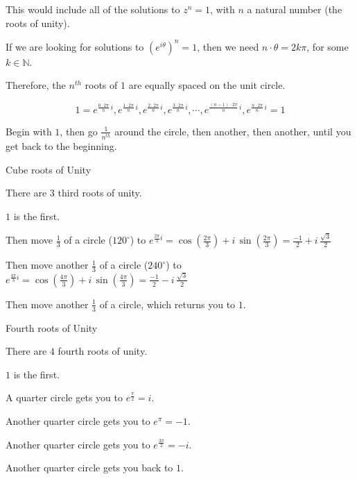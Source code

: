 \documentclass{ximera}
\begin{document}
This would include all of the solutions to $z^n = 1$, with $n$ a natural number (the roots of unity).




If we are looking for solutions to $(e^{i \theta})^n = 1$, then we need $n \cdot \theta = 2k\pi$, for some $k \in \mathbb{N}$.


Therefore, the $n^{th}$ roots of $1$ are equally spaced on the unit circle.  



\[
1=e^{\tfrac{0\cdot2\pi}{n}\,i}, e^{\tfrac{1\cdot2\pi}{n}\,i}, e^{\tfrac{2\cdot2\pi}{n}\,i}, e^{\tfrac{3\cdot2\pi}{n}\,i}, \cdots, e^{\tfrac{(n-1)\cdot2\pi}{n}\,i}, e^{\tfrac{n\cdot2\pi}{n}\,i}=1
\]



Begin with $1$, then go $\frac{1}{n^{th}}$ around the circle, then another, then another, until you get back to the beginning.




\begin{example}  Cube roots of Unity

There are $3$ third roots of unity.

$1$ is the first.

Then move $\frac{1}{3}$ of a circle ($120^{\circ}$) to $e^{\tfrac{2 \pi}{3} i} = \cos\left(\frac{2 \pi}{3}\right) + i \, \sin\left(\frac{2 \pi}{3}\right) = \frac{-1}{2} + i \, \frac{\sqrt{3}}{2}$

Then move another $\frac{1}{3}$ of a circle ($240^{\circ}$) to $e^{\tfrac{4 \pi}{3} i} = \cos\left(\frac{4 \pi}{3}\right) + i \, \sin\left(\frac{4 \pi}{3}\right) = \frac{-1}{2} - i \, \frac{\sqrt{3}}{2}$



Then move another $\frac{1}{3}$ of a circle, which returns you to $1$.




\end{example}











\begin{example}  Fourth roots of Unity

There are $4$ fourth roots of unity.

$1$ is the first.

A quarter circle gets you to $e^{\tfrac{\pi}{2}} = i$. 

Another quarter circle gets you to $e^{\pi} = -1$. 

Another quarter circle gets you to $e^{\tfrac{3\pi}{2}} = -i$. 

Another quarter circle gets you back to $1$.


\end{example}
\end{document}
